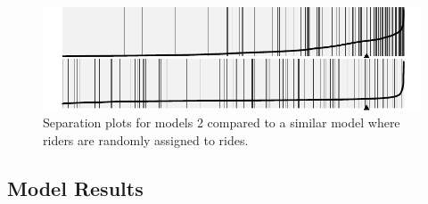 \documentclass[]{article}
\begin{document}
\begin{figure}[tbh]
\centering
\includegraphics[angle = 0,scale = 1]{figure/intercept_test_plot.pdf}
\caption[Separation plots for models 2 compared to a similar model where
riders are randomly assigned to rides.]{\normalsize{Separation plots for models 2 compared to a similar model where
riders are randomly assigned to rides.}}
\label{fig:sep-plots-intercept-test}
\end{figure}

\subsection{Model Results}\label{model-results}
\end{document}
